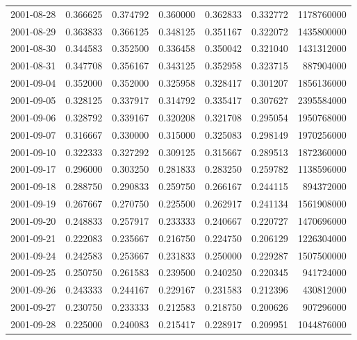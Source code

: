\begin{tabular}{lrrrrrr}
2001-08-28 &    0.366625 &    0.374792 &    0.360000 &    0.362833 &    0.332772 &  1178760000 \\
2001-08-29 &    0.363833 &    0.366125 &    0.348125 &    0.351167 &    0.322072 &  1435800000 \\
2001-08-30 &    0.344583 &    0.352500 &    0.336458 &    0.350042 &    0.321040 &  1431312000 \\
2001-08-31 &    0.347708 &    0.356167 &    0.343125 &    0.352958 &    0.323715 &   887904000 \\
2001-09-04 &    0.352000 &    0.352000 &    0.325958 &    0.328417 &    0.301207 &  1856136000 \\
2001-09-05 &    0.328125 &    0.337917 &    0.314792 &    0.335417 &    0.307627 &  2395584000 \\
2001-09-06 &    0.328792 &    0.339167 &    0.320208 &    0.321708 &    0.295054 &  1950768000 \\
2001-09-07 &    0.316667 &    0.330000 &    0.315000 &    0.325083 &    0.298149 &  1970256000 \\
2001-09-10 &    0.322333 &    0.327292 &    0.309125 &    0.315667 &    0.289513 &  1872360000 \\
2001-09-17 &    0.296000 &    0.303250 &    0.281833 &    0.283250 &    0.259782 &  1138596000 \\
2001-09-18 &    0.288750 &    0.290833 &    0.259750 &    0.266167 &    0.244115 &   894372000 \\
2001-09-19 &    0.267667 &    0.270750 &    0.225500 &    0.262917 &    0.241134 &  1561908000 \\
2001-09-20 &    0.248833 &    0.257917 &    0.233333 &    0.240667 &    0.220727 &  1470696000 \\
2001-09-21 &    0.222083 &    0.235667 &    0.216750 &    0.224750 &    0.206129 &  1226304000 \\
2001-09-24 &    0.242583 &    0.253667 &    0.231833 &    0.250000 &    0.229287 &  1507500000 \\
2001-09-25 &    0.250750 &    0.261583 &    0.239500 &    0.240250 &    0.220345 &   941724000 \\
2001-09-26 &    0.243333 &    0.244167 &    0.229167 &    0.231583 &    0.212396 &   430812000 \\
2001-09-27 &    0.230750 &    0.233333 &    0.212583 &    0.218750 &    0.200626 &   907296000 \\
2001-09-28 &    0.225000 &    0.240083 &    0.215417 &    0.228917 &    0.209951 &  1044876000 \\

\end{tabular}
